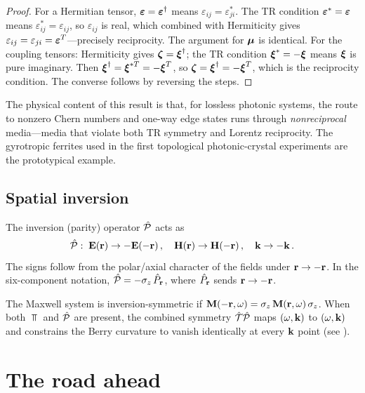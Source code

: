 \begin{proof}
For a Hermitian tensor, $\boldsymbol{\varepsilon}=\boldsymbol{\varepsilon}^\dagger$ means
$\varepsilon_{ij}=\varepsilon_{ji}^*$.  The TR condition
$\boldsymbol{\varepsilon}^*=\boldsymbol{\varepsilon}$ means $\varepsilon_{ij}^*=\varepsilon_{ij}$, so
$\varepsilon_{ij}$ is real, which combined with Hermiticity gives
$\varepsilon_{ij}=\varepsilon_{ji}=\boldsymbol{\varepsilon}^T$---precisely reciprocity.
The argument for $\boldsymbol{\mu}$ is identical.  For the coupling tensors:
Hermiticity gives $\boldsymbol{\zeta}=\boldsymbol{\xi}^\dagger$; the TR condition
$\boldsymbol{\xi}^*=-\boldsymbol{\xi}$ means $\boldsymbol{\xi}$ is pure imaginary.  Then
$\boldsymbol{\xi}^\dagger=\boldsymbol{\xi}^{*T}=-\boldsymbol{\xi}^T$, so
$\boldsymbol{\zeta}=\boldsymbol{\xi}^\dagger=-\boldsymbol{\xi}^T$, which is the reciprocity condition.
The converse follows by reversing the steps.
\end{proof}

The physical content of this result is that, for lossless photonic
systems, the route to nonzero Chern numbers and one-way edge states
runs through \emph{nonreciprocal} media---media that violate both
TR symmetry and Lorentz reciprocity.  The gyrotropic ferrites
used in the first topological photonic-crystal experiments are the
prototypical example.

\subsection{Spatial inversion}
\label{sec:ch2-inversion}

The inversion (parity) operator $\hat{\mathcal{P}}$ acts as
\begin{equation}\label{eq:ch2-inversion}
  \hat{\mathcal{P}}:\;
  \mathbf{E}(\mathbf{r})\to-\mathbf{E}(-\mathbf{r})\,,\quad
  \mathbf{H}(\mathbf{r})\to\mathbf{H}(-\mathbf{r})\,,\quad
  \mathbf{k}\to-\mathbf{k}\,.
\end{equation}
The signs follow from the polar/axial character of the fields under
$\mathbf{r}\to-\mathbf{r}$.  In the six-component notation,
$\hat{\mathcal{P}} = -\sigma_z\,\hat{P}_{\mathbf{r}}$, where $\hat{P}_{\mathbf{r}}$ sends
$\mathbf{r}\to-\mathbf{r}$.

The Maxwell system is inversion-symmetric if
$\mathbf{M}(-\mathbf{r},\omega)=\sigma_z\,\mathbf{M}(\mathbf{r},\omega)\,\sigma_z$.
When both $\Top$ and $\hat{\mathcal{P}}$ are present, the combined symmetry
$\hat{\mathcal{T}}\hat{\mathcal{P}}$ maps $(\omega,\mathbf{k})$ to $(\omega,\mathbf{k})$ and constrains
the Berry curvature to vanish identically at every $\mathbf{k}$ point
(see ).

\section{The road ahead}
\label{sec:ch2-road-ahead}

